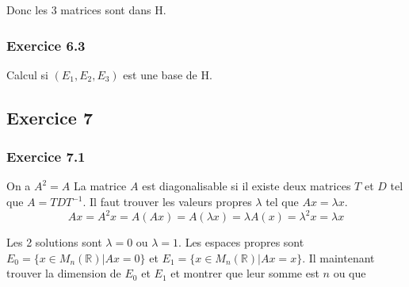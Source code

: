 \documentclass[]{book}
\theoremstyle{definition}
\newcommand{\bb}[1]{\mathbb{#1}}
\newcommand{\R}{\bb{R}}
\begin{document}
Donc les 3 matrices sont dans H.

\subsubsection*{Exercice 6.3}
Calcul si $(E_1, E_2, E_3)$ est une base de H. 

\subsection*{Exercice 7}
\subsubsection*{Exercice 7.1}
On a $A^2 = A$ La matrice $A$ est diagonalisable si il existe deux matrices $T$ et $D$ tel que $A=TDT^{-1}$. Il faut trouver les valeurs propres $\lambda$ tel que $Ax = \lambda x$.
$$
Ax = A^2x = A(Ax) = A(\lambda x) = \lambda A(x) = \lambda^2 x = \lambda x
$$

Les 2 solutions sont $\lambda = 0$ ou $\lambda = 1$. Les espaces propres sont $E_0 = \{x \in M_n(\R)|Ax = 0\}$ et $E_1 = \{x \in M_n(\R)|Ax = x\}$. Il maintenant trouver la dimension de $E_0$ et $E_1$ et montrer que leur somme est $n$ ou que 
\end{document}
